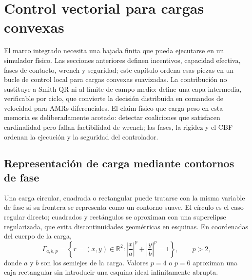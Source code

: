 \section{Control vectorial para cargas convexas}
\label{sec:control-vectorial-ejecutable}

El marco integrado necesita una bajada finita que pueda ejecutarse en un simulador físico.
Las secciones anteriores definen incentivos, capacidad efectiva, fases de contacto,
wrench y seguridad; este capítulo ordena esas piezas en un bucle de control local para
cargas convexas suavizadas. La contribución no sustituye a Smith-QR ni al límite de campo
medio: define una capa intermedia, verificable por ciclo, que convierte la decisión
distribuida en comandos de velocidad para AMRs diferenciales.
El claim físico que carga peso en esta memoria es deliberadamente acotado: detectar
coaliciones que satisfacen cardinalidad pero fallan factibilidad de wrench; las fases,
la rigidez y el CBF ordenan la ejecución y la seguridad del controlador.



\subsection{Representación de carga mediante contornos de fase}
\label{subsec:control-superelipse}

Una carga circular, cuadrada o rectangular puede tratarse con la misma variable de fase
si su frontera se representa como un contorno suave. El círculo es el caso regular
directo; cuadrados y rectángulos se aproximan con una superelipse regularizada, que evita
discontinuidades geométricas en esquinas. En coordenadas del cuerpo de la carga,
\begin{equation}
  \Gamma_{a,b,p}
  =
  \left\{
    r=(x,y)\in\mathbb R^2:
    \left|\frac{x}{a}\right|^p+
    \left|\frac{y}{b}\right|^p
    =
    1
  \right\},
  \qquad
  p>2,
  \label{eq:ctrl_superelipse_implicita}
\end{equation}
donde $a$ y $b$ son los semiejes de la carga. Valores $p=4$ o $p=6$ aproximan una caja
rectangular sin introducir una esquina ideal infinitamente abrupta.

